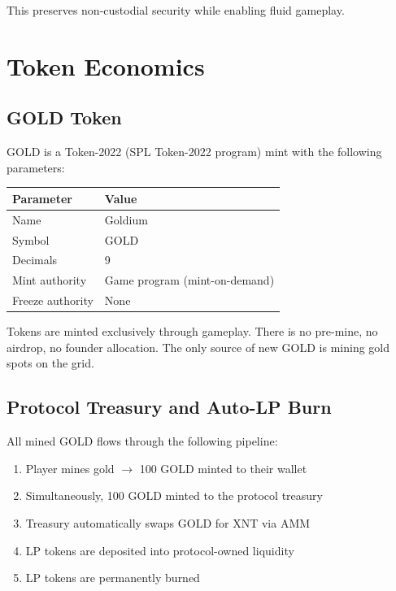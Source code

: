 \documentclass[11pt,a4paper]{article}
\begin{document}
This preserves non-custodial security while enabling fluid gameplay.

\section{Token Economics}

\subsection{GOLD Token}

GOLD is a Token-2022 (SPL Token-2022 program) mint with the following parameters:

\begin{table}[h]
\centering
\begin{tabular}{@{}ll@{}}
\toprule
Parameter & Value \\
\midrule
Name & Goldium \\
Symbol & GOLD \\
Decimals & 9 \\
Mint authority & Game program (mint-on-demand) \\
Freeze authority & None \\
\bottomrule
\end{tabular}
\end{table}

Tokens are minted exclusively through gameplay. There is no pre-mine, no airdrop, no founder allocation. The only source of new GOLD is mining gold spots on the grid.

\subsection{Protocol Treasury and Auto-LP Burn}

All mined GOLD flows through the following pipeline:

\begin{enumerate}[leftmargin=2em]
\item Player mines gold $\rightarrow$ 100 GOLD minted to their wallet
\item Simultaneously, 100 GOLD minted to the protocol treasury
\item Treasury automatically swaps GOLD for XNT via AMM
\item LP tokens are deposited into protocol-owned liquidity
\item LP tokens are permanently burned
\end{enumerate}
\end{document}
